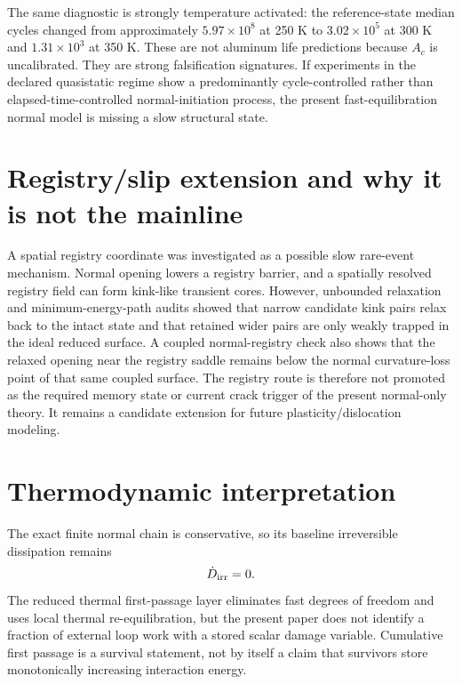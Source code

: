 \documentclass[11pt]{article}
\begin{document}
The same diagnostic is strongly temperature activated: the reference-state median cycles changed from approximately $5.97\times10^8$ at 250 K to $3.02\times10^5$ at 300 K and $1.31\times10^3$ at 350 K. These are not aluminum life predictions because $A_c$ is uncalibrated. They are strong falsification signatures. If experiments in the declared quasistatic regime show a predominantly cycle-controlled rather than elapsed-time-controlled normal-initiation process, the present fast-equilibration normal model is missing a slow structural state.

\section{Registry/slip extension and why it is not the mainline}
A spatial registry coordinate was investigated as a possible slow rare-event mechanism. Normal opening lowers a registry barrier, and a spatially resolved registry field can form kink-like transient cores. However, unbounded relaxation and minimum-energy-path audits showed that narrow candidate kink pairs relax back to the intact state and that retained wider pairs are only weakly trapped in the ideal reduced surface. A coupled normal-registry check also shows that the relaxed opening near the registry saddle remains below the normal curvature-loss point of that same coupled surface. The registry route is therefore not promoted as the required memory state or current crack trigger of the present normal-only theory. It remains a candidate extension for future plasticity/dislocation modeling.

\section{Thermodynamic interpretation}
The exact finite normal chain is conservative, so its baseline irreversible dissipation remains
\begin{equation}
\dot D_{\rm irr}=0.
\end{equation}
The reduced thermal first-passage layer eliminates fast degrees of freedom and uses local thermal re-equilibration, but the present paper does not identify a fraction of external loop work with a stored scalar damage variable. Cumulative first passage is a survival statement, not by itself a claim that survivors store monotonically increasing interaction energy.
\end{document}
